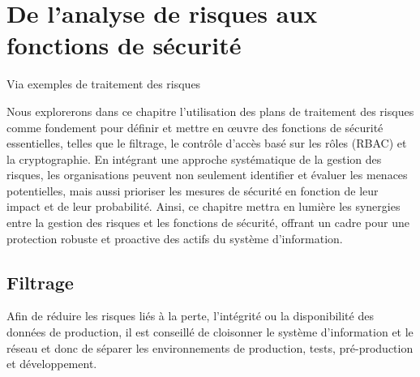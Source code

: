 \section{De l’analyse de risques aux fonctions de sécurité}
Via exemples de traitement des risques 

Nous explorerons dans ce chapitre l'utilisation des plans de traitement des risques comme fondement pour définir et mettre en œuvre des fonctions de sécurité essentielles, telles que le filtrage, le contrôle d'accès basé sur les rôles (RBAC) et la cryptographie. 
En intégrant une approche systématique de la gestion des risques, les organisations peuvent non seulement identifier et évaluer les menaces potentielles, mais aussi prioriser les mesures de sécurité en fonction de leur impact et de leur probabilité. 
Ainsi, ce chapitre mettra en lumière les synergies entre la gestion des risques et les fonctions de sécurité, offrant un cadre pour une protection robuste et proactive des actifs du système d'information.

\subsection{Filtrage}

Afin de réduire les risques liés à la perte, l'intégrité ou la disponibilité des données de production, il est conseillé de cloisonner le système d'information et le réseau et donc de séparer les environnements de production, tests, pré-production et développement.

